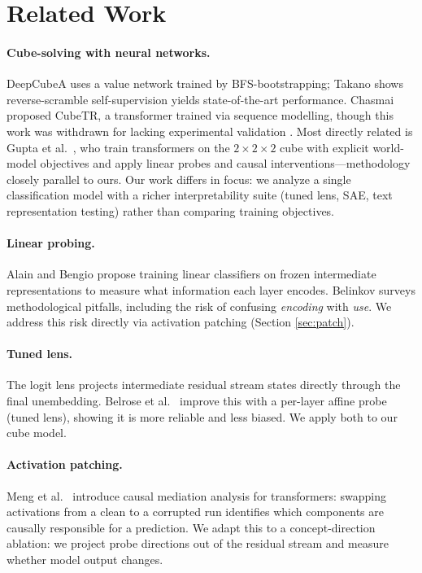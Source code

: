 \documentclass[12pt]{article}
\begin{document}
\section{Related Work}

\paragraph{Cube-solving with neural networks.}
DeepCubeA \cite{agostinelli2019deepcubea} uses a value network trained by
BFS-bootstrapping; Takano \cite{takano2021selfsupervision} shows reverse-scramble
self-supervision yields state-of-the-art performance.  Chasmai proposed CubeTR, a transformer trained via sequence modelling, though
this work was withdrawn for lacking experimental validation
\cite{chasmai2021cubetr}.  Most directly related is Gupta et al.\
\cite{gupta2024worldmodels}, who train transformers on the $2{\times}2{\times}2$
cube with explicit world-model objectives and apply linear probes and causal
interventions---methodology closely parallel to ours.  Our work differs in focus:
we analyze a single classification model with a richer interpretability suite
(tuned lens, SAE, text representation testing) rather than comparing training
objectives.

\paragraph{Linear probing.}
Alain and Bengio \cite{alain2016probes} propose training linear classifiers on
frozen intermediate representations to measure what information each layer
encodes.  Belinkov \cite{belinkov2022probing} surveys methodological pitfalls,
including the risk of confusing \emph{encoding} with \emph{use}.  We address this
risk directly via activation patching (Section \ref{sec:patch}).

\paragraph{Tuned lens.}
The logit lens \cite{nostalgebraist2020logitlens} projects intermediate residual
stream states directly through the final unembedding.  Belrose et al.\
\cite{belrose2023tunedlens} improve this with a per-layer affine probe (tuned
lens), showing it is more reliable and less biased.  We apply both to our cube
model.

\paragraph{Activation patching.}
Meng et al.\ \cite{meng2022locatingfactual} introduce causal mediation analysis
for transformers: swapping activations from a clean to a corrupted run identifies
which components are causally responsible for a prediction.  We adapt this to a
concept-direction ablation: we project probe directions out of the residual stream
and measure whether model output changes.
\end{document}

